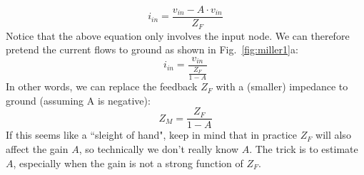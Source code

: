     \begin{equation}
        i_{in} = \frac{ v_{in} - A\cdot v_{in} }{Z_F}
    \end{equation}
Notice that the above equation only involves the input node.  We can therefore pretend the current flows to ground as shown in Fig.~\ref{fig:miller1}a:
    \begin{equation}
        i_{in} = \frac{v_{in}}{\frac{Z_F}{1 - A}}
    \end{equation}
In other words, we can replace the feedback $Z_F$ with a (smaller) impedance to ground (assuming A is negative):
    \begin{equation}
        Z_M = \frac{Z_F}{1 - A}
    \end{equation}
If this seems like a ``sleight of hand", keep in mind that in practice $Z_F$ will also affect the gain $A$, so technically we don't really know $A$. The trick is to estimate $A$, especially when the gain is not a strong function of $Z_F$.
